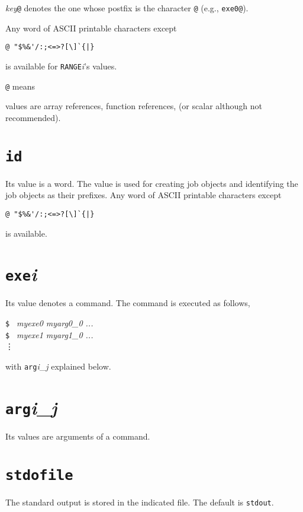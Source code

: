 \documentclass[a4paper,10pt]{report}
\begin{document}
\textit{key}\texttt{@} denotes the one whose postfix is the
character \texttt{@} (e.g., \texttt{exe0@}).


Any word of ASCII printable characters except
\begin{center}
\verb*+@ "$%&'/:;<=>?[\]`{|}+        %
\end{center}
is available for \texttt{RANGE}\textit{i}'s values.

\texttt{@} means

values are array references, function references, (or scalar although
not recommended).

\section{\texttt{id}}

Its value is a word.  The value is used for creating job objects and
identifying the job objects as their prefixes.  Any word of ASCII
printable characters except
\begin{center}
\verb*+@ "$%&'/:;<=>?[\]`{|}+        %
\end{center}
is available.

\section{\texttt{exe}\textit{i}}

Its value denotes a command.  The command is executed as follows,
\begin{screen}
\texttt{\$ } \textit{myexe0 myarg0\_0 ...}\\
\texttt{\$ } \textit{myexe1 myarg1\_0 ...}\\
\vdots
\end{screen}
with \texttt{arg}\textit{i}\_\textit{j} explained below.

\section{\texttt{arg}\textit{i}\_\textit{j}}

Its values are arguments of a command.

\section{\texttt{stdofile}}

The standard output is stored in the indicated file.
The default is \texttt{stdout}.
\end{document}
